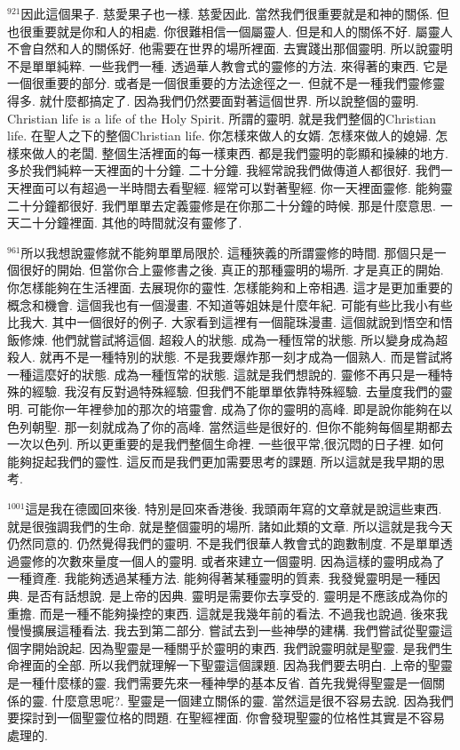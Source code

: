 \documentclass{book}
\begin{document}
$^{921}$因此這個果子.
慈愛果子也一樣.
慈愛因此.
當然我們很重要就是和神的關係.
但也很重要就是你和人的相處.
你很難相信一個屬靈人.
但是和人的關係不好.
屬靈人不會自然和人的關係好.
他需要在世界的場所裡面.
去實踐出那個靈明.
所以說靈明不是單單純粹.
一些我們一種.
透過華人教會式的靈修的方法.
來得著的東西.
它是一個很重要的部分.
或者是一個很重要的方法途徑之一.
但就不是一種我們靈修靈得多.
就什麼都搞定了.
因為我們仍然要面對著這個世界.
所以說整個的靈明.
Christian life is a life of the Holy Spirit.
所謂的靈明.
就是我們整個的Christian life.
在聖人之下的整個Christian life.
你怎樣來做人的女婿.
怎樣來做人的媳婦.
怎樣來做人的老闆.
整個生活裡面的每一樣東西.
都是我們靈明的彰顯和操練的地方.
多於我們純粹一天裡面的十分鐘.
二十分鐘.
我經常說我們做傳道人都很好.
我們一天裡面可以有超過一半時間去看聖經.
經常可以對著聖經.
你一天裡面靈修.
能夠靈二十分鐘都很好.
我們單單去定義靈修是在你那二十分鐘的時候.
那是什麼意思.
一天二十分鐘裡面.
其他的時間就沒有靈修了.

$^{961}$所以我想說靈修就不能夠單單局限於.
這種狹義的所謂靈修的時間.
那個只是一個很好的開始.
但當你合上靈修書之後.
真正的那種靈明的場所.
才是真正的開始.
你怎樣能夠在生活裡面.
去展現你的靈性.
怎樣能夠和上帝相遇.
這才是更加重要的概念和機會.
這個我也有一個漫畫.
不知道等姐妹是什麼年紀.
可能有些比我小有些比我大.
其中一個很好的例子.
大家看到這裡有一個龍珠漫畫.
這個就說到悟空和悟飯修煉.
他們就嘗試將這個.
超殺人的狀態.
成為一種恆常的狀態.
所以變身成為超殺人.
就再不是一種特別的狀態.
不是我要爆炸那一刻才成為一個熟人.
而是嘗試將一種這麼好的狀態.
成為一種恆常的狀態.
這就是我們想說的.
靈修不再只是一種特殊的經驗.
我沒有反對過特殊經驗.
但我們不能單單依靠特殊經驗.
去量度我們的靈明.
可能你一年裡參加的那次的培靈會.
成為了你的靈明的高峰.
即是說你能夠在以色列朝聖.
那一刻就成為了你的高峰.
當然這些是很好的.
但你不能夠每個星期都去一次以色列.
所以更重要的是我們整個生命裡.
一些很平常,很沉悶的日子裡.
如何能夠捉起我們的靈性.
這反而是我們更加需要思考的課題.
所以這就是我早期的思考.

$^{1001}$這是我在德國回來後.
特別是回來香港後.
我頭兩年寫的文章就是說這些東西.
就是很強調我們的生命.
就是整個靈明的場所.
諸如此類的文章.
所以這就是我今天仍然同意的.
仍然覺得我們的靈明.
不是我們很華人教會式的跑數制度.
不是單單透過靈修的次數來量度一個人的靈明.
或者來建立一個靈明.
因為這樣的靈明成為了一種資產.
我能夠透過某種方法.
能夠得著某種靈明的質素.
我發覺靈明是一種因典.
是否有話想說.
是上帝的因典.
靈明是需要你去享受的.
靈明是不應該成為你的重擔.
而是一種不能夠操控的東西.
這就是我幾年前的看法.
不過我也說過.
後來我慢慢擴展這種看法.
我去到第二部分.
嘗試去到一些神學的建構.
我們嘗試從聖靈這個字開始說起.
因為聖靈是一種關乎於靈明的東西.
我們說靈明就是聖靈.
是我們生命裡面的全部.
所以我們就理解一下聖靈這個課題.
因為我們要去明白.
上帝的聖靈是一種什麼樣的靈.
我們需要先來一種神學的基本反省.
首先我覺得聖靈是一個關係的靈.
什麼意思呢?.
聖靈是一個建立關係的靈.
當然這是很不容易去說.
因為我們要探討到一個聖靈位格的問題.
在聖經裡面.
你會發現聖靈的位格性其實是不容易處理的.
\end{document}
